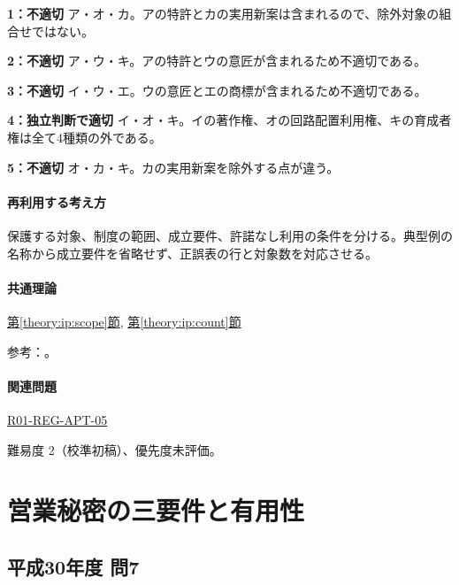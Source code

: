 \noindent\textbf{1：不適切} ア・オ・カ。アの特許とカの実用新案は含まれるので、除外対象の組合せではない。\par

\noindent\textbf{2：不適切} ア・ウ・キ。アの特許とウの意匠が含まれるため不適切である。\par

\noindent\textbf{3：不適切} イ・ウ・エ。ウの意匠とエの商標が含まれるため不適切である。\par

\noindent\textbf{4：独立判断で適切} イ・オ・キ。イの著作権、オの回路配置利用権、キの育成者権は全て4種類の外である。\par

\noindent\textbf{5：不適切} オ・カ・キ。カの実用新案を除外する点が違う。\par

\paragraph{再利用する考え方} 保護する対象、制度の範囲、成立要件、許諾なし利用の条件を分ける。典型例の名称から成立要件を省略せず、正誤表の行と対象数を対応させる。

\paragraph{共通理論} \hyperref[theory:ip:scope]{第\ref*{theory:ip:scope}節}, \hyperref[theory:ip:count]{第\ref*{theory:ip:count}節}

\par 参考：\cite{ip_industrial_four,ip_broad_scope}。

\paragraph{関連問題} \hyperref[q:r01-reg-apt-05]{R01-REG-APT-05}

\par 難易度 2（校準初稿）、優先度未評価。

\section{営業秘密の三要件と有用性}

\subsection{平成30年度 問7}
\label{q:h30-reg-apt-07}

